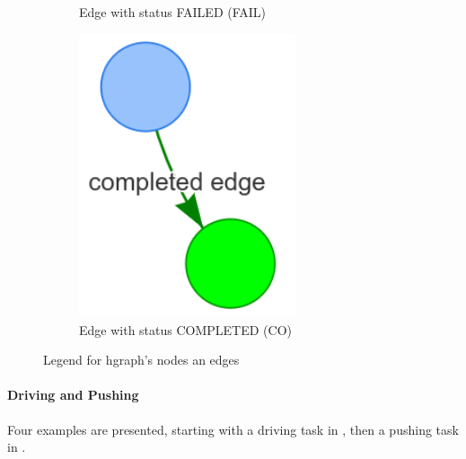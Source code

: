 \begin{figure}[H]
\begin{subfigure}{0.33\textwidth}
    \caption{Edge with status FAILED (FAIL)}%
    \end{subfigure}
    \begin{subfigure}{0.33\textwidth}
    \centering
    \includegraphics[width=0.7\textwidth]{figures/connecting_nodes/legend/completed_edge}
    \caption{Edge with status COMPLETED (CO)}%
    \end{subfigure}
    \caption{Legend for \ac{hgraph}'s nodes an edges}%
    \label{fig:hgraph_legend}
\end{figure}

\paragraph{Driving and Pushing} Four examples are presented, starting with a driving task in , then a pushing task in .\bs

